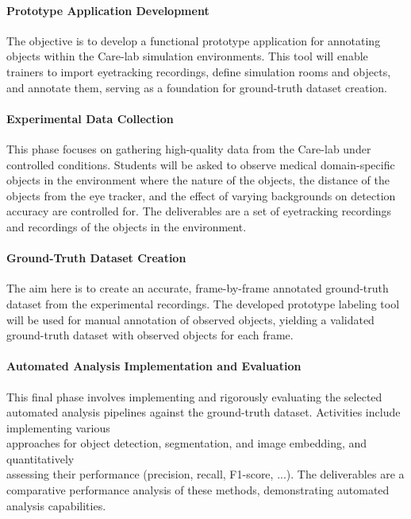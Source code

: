 \documentclass[english]{hogent-article}
\begin{document}
\paragraph{Prototype Application Development\\}
The objective is to develop a functional prototype application for annotating objects within the Care-lab simulation environments.
This tool will enable trainers to import eyetracking recordings, define simulation rooms and objects, and annotate them, 
serving as a foundation for ground-truth dataset creation.

\paragraph{Experimental Data Collection\\}
This phase focuses on gathering high-quality data from the Care-lab under controlled conditions. 
Students will be asked to observe medical domain-specific objects in the environment where the nature of the objects, 
the distance of the objects from the eye tracker, and the effect of varying backgrounds on detection accuracy are controlled for.
The deliverables are a set of eyetracking recordings and recordings of the objects in the environment.

\paragraph{Ground-Truth Dataset Creation\\}
The aim here is to create an accurate, frame-by-frame annotated ground-truth dataset from the experimental recordings. 
The developed prototype labeling tool will be used for manual annotation of observed objects, 
yielding a validated ground-truth dataset with observed objects for each frame.

\paragraph{Automated Analysis Implementation and Evaluation\\}
This final phase involves implementing and rigorously evaluating the selected automated analysis pipelines 
against the ground-truth dataset.
Activities include implementing various\\ approaches for object detection, segmentation, and image embedding, and quantitatively\\
assessing their performance (precision, recall, F1-score, ...).
The deliverables are a comparative performance analysis of these methods, demonstrating automated analysis capabilities.
\end{document}
